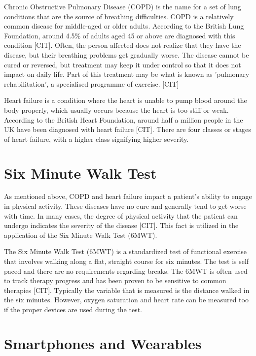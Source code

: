             Chronic Obstructive Pulmonary Disease (COPD) is the name for a set of lung conditions that are the source of breathing difficulties. COPD is a relatively common disease for middle-aged or older adults. According to the British Lung Foundation, around 4.5\% of adults aged 45 or above are diagnosed with this condition [CIT]. Often, the person affected does not realize that they have the disease, but their breathing problems get gradually worse. The disease cannot be cured or reversed, but treatment may keep it under control so that it does not impact on daily life. Part of this treatment may be what is known as 'pulmonary rehabilitation', a specialised programme of exercise. [CIT]

            Heart failure is a condition where the heart is unable to pump blood around the body properly, which usually occurs because the heart is too stiff or weak. According to the British Heart Foundation, around half a million people in the UK have been diagnosed with heart failure [CIT]. There are four classes or stages of heart failure, with a higher class signifying higher severity. 

        \section{Six Minute Walk Test}

            As mentioned above, COPD and heart failure impact a patient's ability to engage in physical activity. These diseases have no cure and generally tend to get worse with time. In many cases, the degree of physical activity that the patient can undergo indicates the severity of the disease [CIT]. This fact is utilized in the application of the Six Minute Walk Test (6MWT).

            The Six Minute Walk Test (6MWT) is a standardized test of functional exercise that involves walking along a flat, straight course for six minutes. The test is self paced and there are no requirements regarding breaks. The 6MWT is often used to track therapy progress and has been proven to be sensitive to common therapies [CIT]. Typically the variable that is measured is the distance walked in the six minutes. However, oxygen saturation and heart rate can be measured too if the proper devices are used during the test.

        \section{Smartphones and Wearables}

